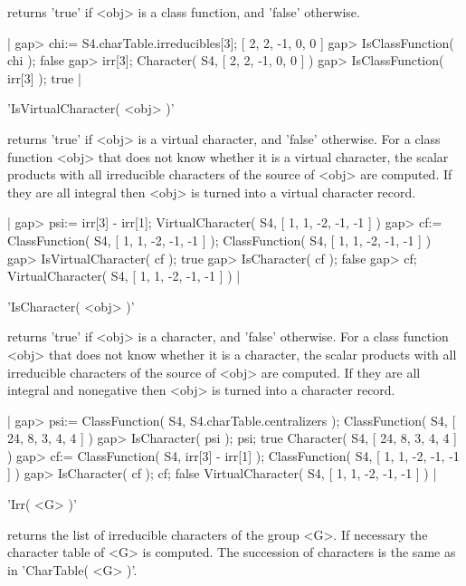 returns 'true' if <obj> is a class function, and 'false' otherwise.

|    gap> chi:= S4.charTable.irreducibles[3];
    [ 2, 2, -1, 0, 0 ]
    gap> IsClassFunction( chi );
    false
    gap> irr[3];
    Character( S4, [ 2, 2, -1, 0, 0 ] )
    gap> IsClassFunction( irr[3] );
    true |


'IsVirtualCharacter( <obj> )'

returns 'true' if <obj> is a virtual character, and 'false' otherwise.
For a class function <obj> that does not know whether it is a virtual
character, the scalar products with all irreducible characters of the
source of <obj> are computed.  If they are all integral then
<obj> is turned into a virtual character record.

|    gap> psi:= irr[3] - irr[1];
    VirtualCharacter( S4, [ 1, 1, -2, -1, -1 ] )
    gap> cf:= ClassFunction( S4, [ 1, 1, -2, -1, -1 ] );
    ClassFunction( S4, [ 1, 1, -2, -1, -1 ] )
    gap> IsVirtualCharacter( cf );
    true
    gap> IsCharacter( cf );
    false
    gap> cf;
    VirtualCharacter( S4, [ 1, 1, -2, -1, -1 ] ) |


'IsCharacter( <obj> )'

returns 'true' if <obj> is a character, and 'false' otherwise.
For a class function <obj> that does not know whether it is a
character, the scalar products with all irreducible characters of the
source of <obj> are computed.  If they are all integral and nonegative then
<obj> is turned into a character record.

|    gap> psi:= ClassFunction( S4, S4.charTable.centralizers );
    ClassFunction( S4, [ 24, 8, 3, 4, 4 ] )
    gap> IsCharacter( psi ); psi;
    true
    Character( S4, [ 24, 8, 3, 4, 4 ] )
    gap> cf:= ClassFunction( S4, irr[3] - irr[1] );
    ClassFunction( S4, [ 1, 1, -2, -1, -1 ] )
    gap> IsCharacter( cf ); cf;
    false
    VirtualCharacter( S4, [ 1, 1, -2, -1, -1 ] ) |


'Irr( <G> )'

returns the list of irreducible characters of the group <G>.
If necessary the character table of <G> is computed.
The succession of characters is the same as in 'CharTable( <G> )'.

